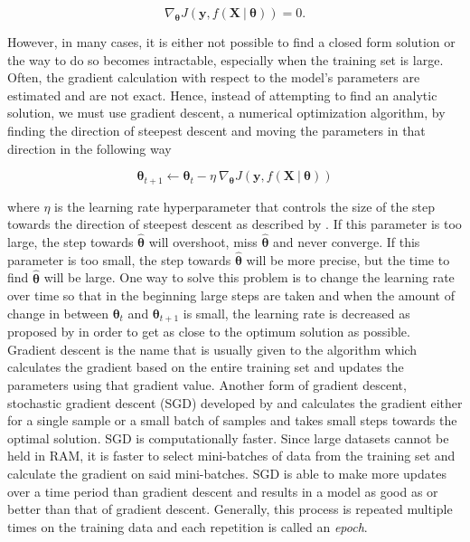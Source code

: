 \begin{equation}
	\nabla_{\boldsymbol{\theta}} J(\mathbf{y}, f(\mathbf{X} \ | \ \boldsymbol{\theta})) = 0.
\end{equation}

However, in many cases, it is either not possible to find a closed form solution or the way to do so becomes intractable, especially when the training set is large. Often, the gradient calculation with respect to the model's parameters are estimated and are not exact. Hence, instead of attempting to find an analytic solution, we must use gradient descent, a numerical optimization algorithm, by finding the direction of steepest descent and moving the parameters in that direction in the following way 

\begin{equation}
	\label{eq:sgd}
	\boldsymbol{\theta}_{t+1} \leftarrow \boldsymbol{\theta}_t - \eta \ \nabla_{\boldsymbol{\theta}} J(\mathbf{y}, f(\mathbf{X} \ | \ \boldsymbol{\theta})) 
\end{equation}

\noindent
where $\eta$ is the learning rate hyperparameter that controls the size of the step towards the direction of steepest descent as described by \citet{gd_explanation}. If this parameter is too large, the step towards $\boldsymbol{\hat{\theta}}$ will overshoot, miss $\boldsymbol{\hat{\theta}}$ and never converge. If this parameter is too small, the step towards $\boldsymbol{\hat{\theta}}$ will be more precise, but the time to find $\boldsymbol{\hat{\theta}}$ will be large. One way to solve this problem is to change the learning rate over time so that in the beginning large steps are taken and when the amount of change in between $\boldsymbol{\theta}_{t}$ and $\boldsymbol{\theta}_{t+1}$ is small, the learning rate is decreased as proposed by \citet{decreasing_learning_rate} in order to get as close to the optimum solution as possible. Gradient descent is the name that is usually given to the algorithm which calculates the gradient based on the entire training set and updates the parameters using that gradient value. Another form of gradient descent, stochastic gradient descent (SGD) developed by \citet{sgd1} and \citet{sgd2}  calculates the gradient either for a single sample or a small batch of samples and takes small steps towards the optimal solution. SGD is computationally faster. Since large datasets cannot be held in RAM, it is faster to select mini-batches of data from the training set and calculate the gradient on said mini-batches. SGD is able to make more updates over a time period than gradient descent and results in a model as good as or better than that of gradient descent. Generally, this process is repeated multiple times on the training data and each repetition is called an \textit{epoch}.

